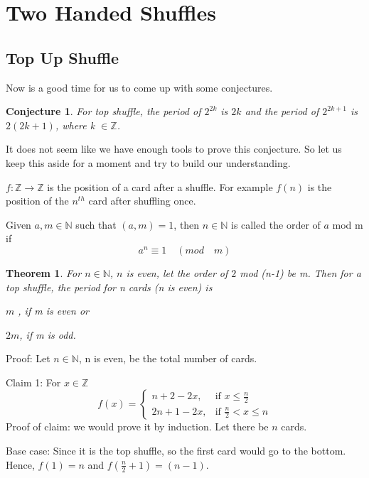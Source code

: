 \documentclass[10pt]{article}
\begin{document}
\vspace{40mm}
\section{Two Handed Shuffles}
\subsection{Top Up Shuffle}
Now is a good time for us to come up with some conjectures.
\newtheorem{conj}{Conjecture}
\begin{conj} For top shuffle, the period of $2^{2k}$ is $2k$ and the period of $2^{2k+1}$ is $2 (2k+1)$, where k $\in\mathbb{Z}$.
\end{conj}

It does not seem like we have enough tools to prove this conjecture. So let us keep this aside for a moment and try to build our understanding.
\vspace{4mm}
\begin{defn} $f:\mathbb{Z}\to \mathbb{Z}$ is the position of a card after a shuffle. For example $f(n)$ is the position of the $n^{th}$ card after shuffling once.
\end{defn}
\begin{defn} Given $a,m \in\mathbb{N}$ such that $(a,m) =1$, then $n\in\mathbb{N}$ is called the order of $a$ mod m if $$a^n\equiv 1 \quad (mod \quad m)$$
\end{defn}

\newtheorem{thm}{Theorem}
\begin{thm}For $n\in\mathbb{N}$, $n$ is even, let the order of $2$ mod (n-1) be m. Then for a top shuffle, the period for n cards (n is even) is

$m$ , if m is even \quad or

$2m$, if m is odd.
\end{thm}
Proof: Let $n \in\mathbb{N}$, n is even, be the total number of cards.

\vspace{4mm}
Claim 1: For $x\in\mathbb{Z}$ 
$$f(x)= 
\begin{cases}
    n+2-2x ,& \text{if } x\leq \frac{n}{2}\\
    2n+1-2x ,& \text{if } \frac{n}{2}<x\leq n
\end{cases}$$
\quad Proof of claim: we would prove it by induction. Let there be $n$ cards.

Base case: Since it is the top shuffle, so the first card would go to the bottom. Hence, $f(1)=n$ and $f(\frac{n}{2}+1)=(n-1)$.
\end{document}
